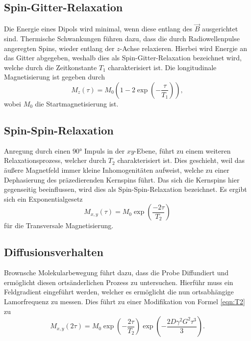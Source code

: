 \subsection{Spin-Gitter-Relaxation}
Die Energie eines Dipols wird minimal, wenn diese entlang des $\vec{B}$ ausgerichtet sind. Thermische Schwankungen führen dazu, dass die durch Radiowellenpulse angeregten Spins, wieder entlang der $z$-Achse relaxieren. Hierbei wird Energie an das Gitter abgegeben, weshalb dies als Spin-Gitter-Relaxation bezeichnet wird, welche durch die Zeitkonstante $T_1$ charakterisiert ist.
Die longitudinale Magnetisierung ist gegeben durch
\begin{equation}
    M_{z} (\tau) = M_0 \left( 1- 2 \exp(-\frac{\tau}{T_1} ) \right) ,
\end{equation}
wobei $M_0$ die Startmagnetisierung ist.
\subsection{Spin-Spin-Relaxation}
Anregung durch einen $90°$ Impuls in der $xy$-Ebene, führt zu einem weiteren Relaxationsprozess, welcher durch $T_2$ charakterisiert ist.
Dies geschieht, weil das äußere Magnetfeld immer kleine Inhomogenitäten aufweist, welche zu einer Dephasierung des präzedierenden Kernspins führt.
Das sich die Kernspins hier gegenseitig beeinflussen, wird dies als Spin-Spin-Relaxation bezeichnet.
Es ergibt sich ein Exponentialgesetz 
\begin{equation}
    \label{eqn:T2}
    M_{x,y}(\tau) = M_0 \exp\left(\frac{-2\tau}{T_2} \right) 
\end{equation}
für die Transversale Magnetisierung.
\subsection{Diffusionsverhalten}
Brownsche Molekularbewegung führt dazu, dass die Probe Diffundiert und ermöglicht diesen ortsänderlichen Prozess zu untersuchen.
Hierführ muss ein Feldgradient eingeführt werden, welcher es ermöglicht die nun ortsabhängige  Lamorfrequenz zu messen. 
Dies führt zu einer Modifikation von Formel \ref{eqn:T2} zu
\begin{equation}
    M_{x,y}(2\tau) = M_0 \exp\left(-\frac{2\tau}{T_2}\right) \exp \left(-\frac{2D\gamma^2 G^2 \tau^3}{3}\right).
\end{equation}